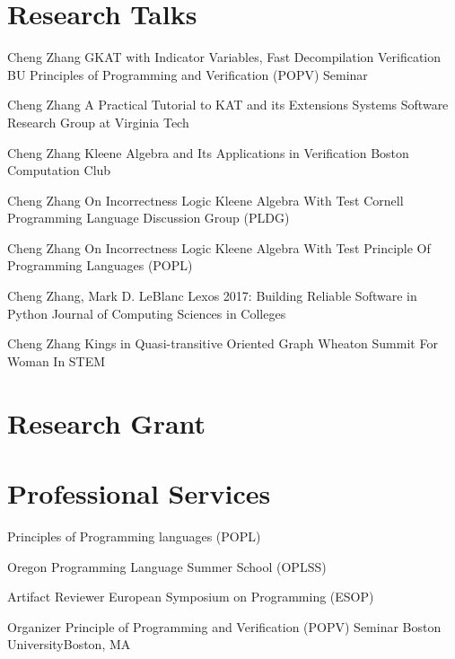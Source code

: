\documentclass[10pt]{moderncv}        %
\let\oldsection=\section
\renewcommand{\section}{%
  \needspace{\baselineskip}
  \oldsection
}
\begin{document}
\section{Research Talks}

{Cheng Zhang}
{GKAT with Indicator Variables, Fast Decompilation Verification}
{BU Principles of Programming and Verification (POPV) Seminar}
{}{}

{Cheng Zhang}
{A Practical Tutorial to KAT and its Extensions}
{Systems Software Research Group at Virginia Tech}
{}{}

{Cheng Zhang}
{Kleene Algebra and Its Applications in Verification}
{Boston Computation Club}
{}{}

{Cheng Zhang}
{On Incorrectness Logic Kleene Algebra With Test}
{Cornell Programming Language Discussion Group (PLDG)}
{}{}

{Cheng Zhang}
{On Incorrectness Logic Kleene Algebra With Test}
{Principle Of Programming Languages (POPL)}
{}{}

{Cheng Zhang, Mark D. LeBlanc}
{Lexos 2017: Building Reliable Software in Python}
{Journal of Computing Sciences in Colleges}
{}{}

{Cheng Zhang}
{Kings in Quasi-transitive Oriented Graph}
{Wheaton Summit For Woman In STEM}
{}{}

\section{Research Grant}



\section{Professional Services}

{Principles of Programming languages (POPL)}{}{}{}

{Oregon Programming Language Summer School (OPLSS)}{}{}{}

{Artifact Reviewer}
{European Symposium on Programming (ESOP)}{}{}{}

{}{}{}

{Organizer}
{Principle of Programming and Verification (POPV) Seminar}
{Boston University}{Boston, MA}
{%
}
\end{document}
